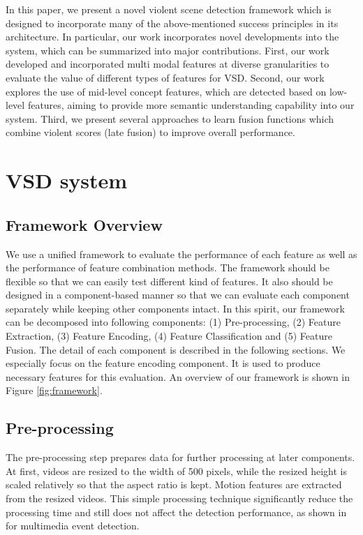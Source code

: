 \documentclass[twocolumn]{bmcart}%
\begin{document}
In this paper, we present a novel violent scene detection framework which is designed to incorporate many of the above-mentioned success principles in its architecture. In particular, our work incorporates novel developments into the system, which can be summarized into major contributions. First, our work developed and incorporated multi modal features at diverse granularities to evaluate the value of different types of features for VSD. Second, our work explores the use of mid-level concept features, which are detected based on low-level features, aiming to provide more semantic understanding capability into our system. Third, we present several approaches to learn fusion functions which combine violent scores (late fusion) to improve overall performance.

\section{VSD system}
\subsection{Framework Overview}
We use a unified framework to evaluate the performance of each feature as well as the performance of feature combination methods. The framework should be flexible so that we can easily test different kind of features. It also should be designed in a component-based manner so that we can evaluate each component separately while keeping other components intact. In this spirit, our framework can be decomposed into following components: (1) Pre-processing, (2) Feature Extraction, (3) Feature Encoding, (4) Feature Classification and (5) Feature Fusion. The detail of each component is described in the following sections. We especially focus on the feature encoding component. It is used to produce necessary features for this evaluation. An overview of our framework is shown in Figure \ref{fig:framework}.

\subsection{Pre-processing}
The pre-processing step prepares data for further processing at later components. At first, videos are resized to the width of 500 pixels, while the resized height is scaled relatively so that the aspect ratio is kept. Motion features are extracted from the resized videos. This simple processing technique significantly reduce the processing time and still does not affect the detection performance, as shown in \cite{aly2013axes} for multimedia event detection.
\end{document}
